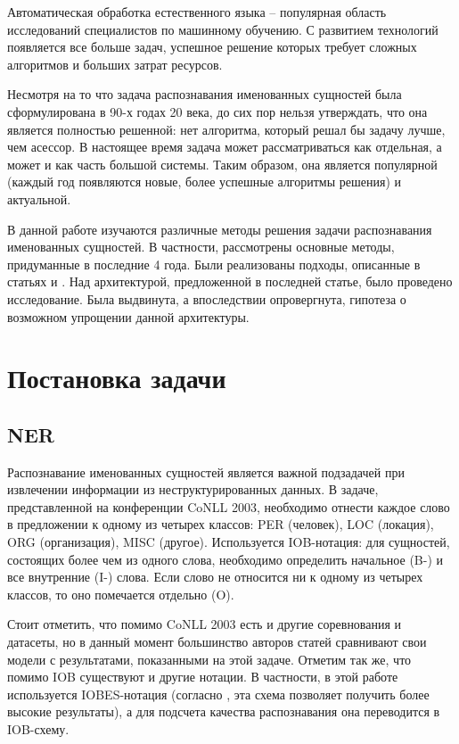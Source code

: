 \documentclass[a4paper,14pt]{extarticle}
\begin{document}
\tableofcontents 
\clearpage


Автоматическая обработка естественного языка -- популярная область исследований специалистов по машинному обучению. С развитием технологий появляется все больше задач, успешное решение которых требует сложных алгоритмов и больших затрат ресурсов.

Несмотря на то что задача распознавания именованных сущностей была сформулирована в 90-х годах 20 века, до сих пор нельзя утверждать, что она является полностью решенной: нет алгоритма, который решал бы задачу лучше, чем асессор. В настоящее время задача может рассматриваться как отдельная, а может и как часть большой системы. Таким образом, она является популярной (каждый год появляются новые, более успешные алгоритмы решения) и актуальной.

В данной работе изучаются различные методы решения задачи распознавания именованных сущностей. В частности, рассмотрены основные методы, придуманные в последние 4 года. Были реализованы подходы, описанные в статьях \cite{1603.01354} и \cite{1808.09075}. Над архитектурой, предложенной в последней статье, было проведено исследование. Была выдвинута, а впоследствии опровергнута, гипотеза о возможном упрощении данной архитектуры.

\clearpage

\section{Постановка задачи}

\subsection{NER}

Распознавание именованных сущностей является важной подзадачей при извлечении информации из неструктурированных данных. В задаче, представленной на конференции CoNLL 2003, необходимо отнести каждое слово в предложении к одному из четырех классов: PER (человек), LOC (локация), ORG (организация), MISC (другое). Используется IOB-нотация: для сущностей, состоящих более чем из одного слова, необходимо определить начальное (B-) и все внутренние (I-) слова. Если слово не относится ни к одному из четырех классов, то оно помечается отдельно (O).

Стоит отметить, что помимо CoNLL 2003 есть и другие соревнования и датасеты, но в данный момент большинство авторов статей сравнивают свои модели с результатами, показанными на этой задаче. Отметим так же, что помимо IOB существуют и другие нотации. В частности, в этой работе используется IOBES-нотация (согласно \cite{ratinov-roth-2009-design}, \cite{1511.08308} эта схема позволяет получить более высокие результаты), а для подсчета качества распознавания она переводится в IOB-схему.
\end{document}
